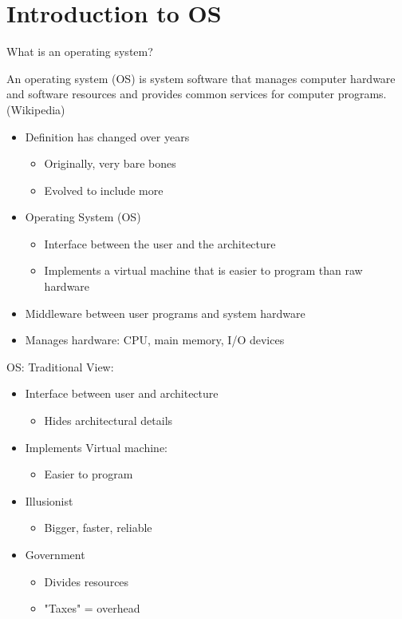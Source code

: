 \documentclass[12pt]{article}
\begin{document}
\section{Introduction to OS}
What is an operating system?

An operating system (OS) is system software that manages computer hardware and software resources and provides common services for computer programs. (Wikipedia)
\begin{itemize}
    \item Definition has changed over years
    \begin{itemize}
        \item Originally, very bare bones
        \item Evolved to include more
    \end{itemize}
    \item Operating System (OS)
    \begin{itemize}
        \item Interface between the user and the architecture
        \item Implements a virtual machine that is easier to program than raw hardware
    \end{itemize}
    \item Middleware between user programs and system hardware
    \item Manages hardware: CPU, main memory, I/O devices
\end{itemize}
OS: Traditional View:
\begin{itemize}
    \item Interface between user and architecture
    \begin{itemize}
        \item Hides architectural details
    \end{itemize}
    \item Implements Virtual machine:
    \begin{itemize}
        \item Easier to program
    \end{itemize}
    \item Illusionist
    \begin{itemize}
        \item Bigger, faster, reliable
    \end{itemize}
    \item Government
    \begin{itemize}
        \item Divides resources
        \item "Taxes" = overhead
    \end{itemize}
\end{itemize}
\end{document}
